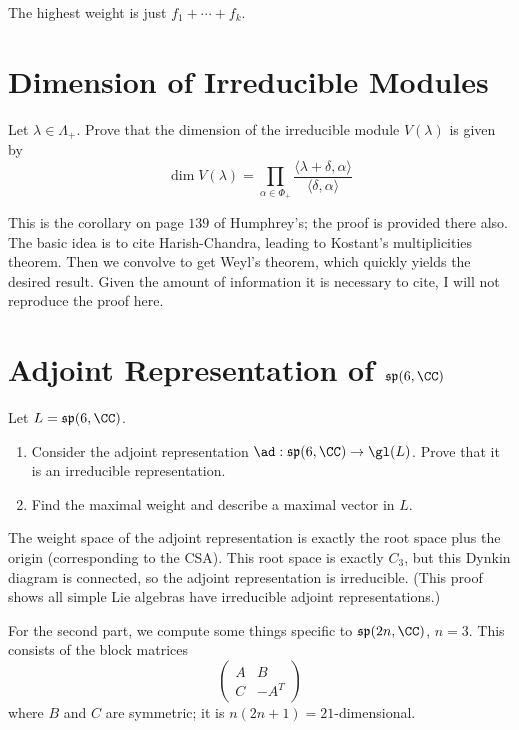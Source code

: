 \documentclass[11pt, headheight=30pt]{scrartcl}
\DeclareMathOperator{\spp}{\mathfrak{sp}}
\begin{document}
The highest weight is just $f_1 + \cdots + f_k$.

\section{Dimension of Irreducible Modules}
\begin{prob*}
Let $\lambda \in \Lambda_+$. Prove that the dimension of the irreducible module $V(\lambda)$ is given by
\[
    \dim V(\lambda) = \prod_{\alpha \in \Phi_+} \frac{\langle \lambda + \delta, \alpha \rangle}{\langle \delta, \alpha \rangle}
\]
\end{prob*}

This is the corollary on page $139$ of Humphrey's; the proof is provided there also. The basic idea is to cite Harish-Chandra, leading to Kostant's multiplicities theorem. Then we convolve to get Weyl's theorem, which quickly yields the desired result. Given the amount of information it is necessary to cite, I will not reproduce the proof here.

\section{Adjoint Representation of $\spp(6, \CC)$}
\begin{prob*}
Let $L = \spp(6, \CC)$.
\begin{enumerate}
    \item Consider the adjoint representation $\ad : \spp(6, \CC) \to \gl(L)$. Prove that it is an irreducible representation.
    \item Find the maximal weight and describe a maximal vector in $L$.
\end{enumerate}
\end{prob*}

The weight space of the adjoint representation is exactly the root space plus the origin (corresponding to the CSA). This root space is exactly $C_3$, but this Dynkin diagram is connected, so the adjoint representation is irreducible. (This proof shows all simple Lie algebras have irreducible adjoint representations.)

For the second part, we compute some things specific to $\spp(2n, \CC)$, $n = 3$. This consists of the block matrices
\[
    \begin{pmatrix}
        A & B \\
        C & -A^T
    \end{pmatrix}
\]
where $B$ and $C$ are symmetric; it is $n(2n + 1) = 21$-dimensional.
\end{document}
